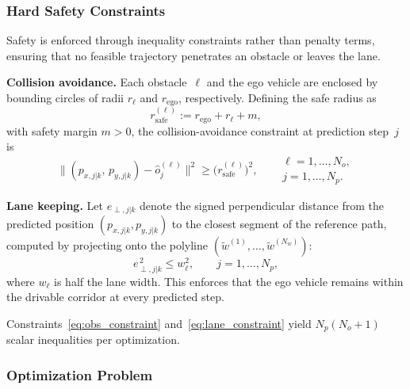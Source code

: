 \documentclass[conference]{IEEEtran}
\begin{document}
\subsubsection{Hard Safety Constraints}\label{sec:constraints}

Safety is enforced through inequality constraints rather than
penalty terms, ensuring that no feasible trajectory penetrates an
obstacle or leaves the lane.

\noindent\textbf{Collision avoidance.}
Each obstacle~$\ell$ and the ego vehicle are enclosed by
bounding circles of radii $r_\ell$ and $r_{\mathrm{ego}}$,
respectively.  Defining the safe radius as
\begin{equation}\label{eq:r_safe}
  r_{\mathrm{safe}}^{(\ell)} := r_{\mathrm{ego}} + r_\ell + m,
\end{equation}
with safety margin $m > 0$, the collision-avoidance constraint at
prediction step~$j$ is
\begin{equation}\label{eq:obs_constraint}
  \bigl\|(p_{x,j|k},\, p_{y,j|k})
  - \hat{o}_j^{(\ell)}\bigr\|^2
  \ge \bigl(r_{\mathrm{safe}}^{(\ell)}\bigr)^2, \quad
  \begin{aligned}
    &\ell = 1,\ldots,N_o, \\
    &j = 1,\ldots,N_p.
  \end{aligned}
\end{equation}

\noindent\textbf{Lane keeping.}
Let $e_{\perp,j|k}$ denote the signed perpendicular distance from
the predicted position $(p_{x,j|k}, p_{y,j|k})$ to the closest
segment of the reference path, computed by projecting onto the
polyline $(\tilde{w}^{(1)},\ldots,\tilde{w}^{(N_w)})$:
\begin{equation}\label{eq:lane_constraint}
  e_{\perp,j|k}^{\,2} \le w_\ell^2, \qquad
  j = 1,\ldots,N_p,
\end{equation}
where $w_\ell$ is half the lane width.  This enforces that the
ego vehicle remains within the drivable corridor at every
predicted step.

\smallskip
Constraints~\eqref{eq:obs_constraint}
and~\eqref{eq:lane_constraint} yield
$N_p(N_o + 1)$ scalar inequalities per optimization.

\subsubsection{Optimization Problem}
\end{document}
